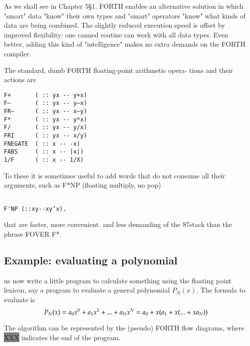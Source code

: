 As we shall see in Chapter 5§1, FORTH enables an alternative
solution in which "smart" data "know" their own types and
"smart" operators "know" what kinds of data are being combined.
The slightly reduced execution speed is offset by improved
ﬂexibility: one canned routine can work with all data types. Even
better, adding this kind of "intelligence" makes no extra demands
on the FORTH compiler.

The standard, dumb FORTH floating-point arithmetic opera-
tions and their actions are

\begin{verbatim}
F+       ( :: yx -- y+x)
F—       ( :: yx -- y—x)
FR—      ( :: yx -- x—y)
F*       ( :: yx -- y*x)
F/       ( :: yx -- y/x)
FRI      ( :: yx -- x/y)
FNEGATE  ( :: x -- -x)
FABS     ( :: x -- |x|)
1/F      ( :: x -- 1/X)
\end{verbatim}

To these it is sometimes useful to add words that do not consume
all their arguments, such as F*NP (floating multiply, no pop)

\begin{verbatim}

F'NP (::xy--xy‘x).

\end{verbatim}

that are faster, more convenient. and less demanding of the
87stack than the phrase FOVER F*.

\subsection{Example: evaluating a polynomial}
 us now write a little program to calculate something using
the floating point lexicon, say a program to evaluate a general
polynomial $P_N (x)$. The formula to evaluate is
\begin{equation}
P_N(x)=a_0x^0+a_1x^1+...+a_Nx^N
\\
=a_0+x(a_1+x(... +xa_N))
\end{equation}



The algorithm can be represented by the (pseudo) FORTH ﬂow
diagrams, where
{\colorbox{gray}{\color{gray}XXX}} indicates the end of the program.


